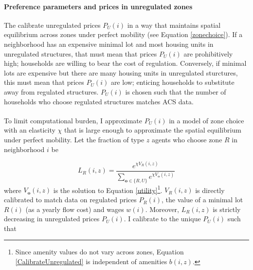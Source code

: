 \documentclass[12pt]{article}
\begin{document}
\paragraph*{Preference parameters and prices in unregulated zones}\label{Calibration:HousingPrices2} The calibrate unregulated prices $P_{U}(i)$ in a way that maintains spatial equilibrium across zones under perfect mobility (see Equation \ref{zonechoice}). If a neighborhood has an expensive minimal lot and most housing units in unregulated structures, that must mean that prices $P_{U}(i)$ are prohibitively high; households are willing to bear the cost of regulation. Conversely, if minimal lots are expensive but there are many housing units in unregulated sturctures, this must mean that prices $P_{U}(i)$ are low; enticing households to substitute away from regulated structures. $P_{U}(i)$ is chosen such that the number of households who choose regulated structures matches ACS data. 

\paragraph*{}
To limit computational burden, I approximate $P_{U}(i)$ in a model of zone choice with an elasticity $\chi$ that is large enough to approximate the spatial equilibrium under perfect mobility. Let the fraction of type $z$ agents who choose zone $R$ in neighborhood $i$ be 

\begin{equation}\label{CalibrateUnregulated}
	L_{R}(i, z) = \frac{e^{\chi V_{R}(i, z)}}{\sum_{\boldsymbol{o} \in \{R, U\}}e^{\chi V_{\boldsymbol{o}}(i, z)}}
\end{equation}
where $V_{\boldsymbol{o}}(i, z)$ is the solution to Equation \eqref{utility}\footnote{Since amenity values do not vary across zones, Equation \ref{CalibrateUnregulated} is independent of amenities $b(i, z)$.}. $V_{R}(i, z)$ is directly calibrated to match data on regulated prices $P_{R}(i)$, the value of a minimal lot $R(i)$ (as a yearly flow cost) and wages $w(i)$. Moreover, $L_{R}(i, z)$ is strictly decreasing in unregulated prices $P_{U}(i)$. I calibrate to the unique $P_{U}(i)$ such that 
\end{document}
